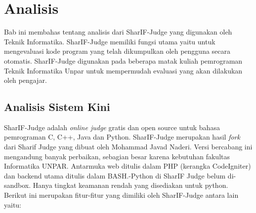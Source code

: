 \chapter{Analisis}
\label{chap:analisis}
Bab ini membahas tentang analisis dari SharIF-Judge yang digunakan oleh Teknik Informatika. SharIF-Judge memiliki fungsi utama yaitu untuk mengevaluasi kode program yang telah dikumpulkan oleh pengguna secara otomatis. SharIF-Judge digunakan pada beberapa matak kuliah pemrograman Teknik Informatika Unpar untuk mempermudah evaluasi yang akan dilakukan oleh pengajar.

\section{Analisis Sistem Kini}
\label{sec: Analisis Sistem Kini}
SharIF-Judge adalah \textit{online judge} gratis dan open source untuk bahasa pemrograman C, C++, Java dan Python. SharIF-Judge merupakan hasil \textit{fork} dari Sharif Judge yang dibuat oleh Mohammad Javad Naderi. Versi bercabang ini mengandung banyak perbaikan, sebagian besar karena kebutuhan fakultas Informatika UNPAR. Antarmuka web ditulis dalam PHP (kerangka CodeIgniter) dan backend utama ditulis dalam BASH.-Python di SharIF Judge belum di-sandbox. Hanya tingkat keamanan rendah yang disediakan untuk python. Berikut ini merupakan fitur-fitur yang dimiliki oleh SharIF-Judge antara lain yaitu:
